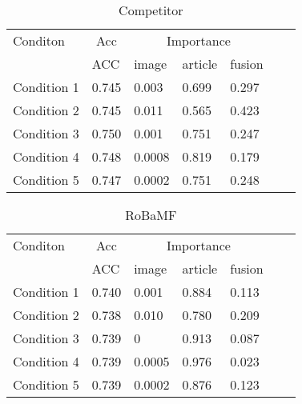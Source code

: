 \begin{table}[htbp]
\centering
\caption{Competitor}
\label{your-label}
\begin{tabular}{@{}lllllll@{}}
\toprule
Conditon       & \multicolumn{1}{c|}{Acc} & \multicolumn{3}{c}{Importance} \\
             & ACC      & image      & article      & fusion     \\
Condition 1   & 0.745         & 0.003         & 0.699         & 0.297       \\
Condition 2   & 0.745         & 0.011         & 0.565         & 0.423       \\
Condition 3   & 0.750         & 0.001         & 0.751         & 0.247       \\
Condition 4   & 0.748         & 0.0008        & 0.819         & 0.179       \\
Condition 5   & 0.747         & 0.0002        & 0.751         & 0.248       \\
\bottomrule
\end{tabular}
\end{table}

\begin{table}[htbp]
\centering
\caption{RoBaMF}
\label{your-label}
\begin{tabular}{@{}lllllll@{}}
\toprule
Conditon       & \multicolumn{1}{c|}{Acc} & \multicolumn{3}{c}{Importance} \\
             & ACC      & image      & article      & fusion     \\
Condition 1   & 0.740         & 0.001         & 0.884         & 0.113       \\
Condition 2   & 0.738         & 0.010         & 0.780         & 0.209       \\
Condition 3   & 0.739         & 0         & 0.913         & 0.087       \\
Condition 4   & 0.739         & 0.0005        & 0.976         & 0.023       \\
Condition 5   & 0.739         & 0.0002        & 0.876         & 0.123       \\
\bottomrule
\end{tabular}
\end{table}






